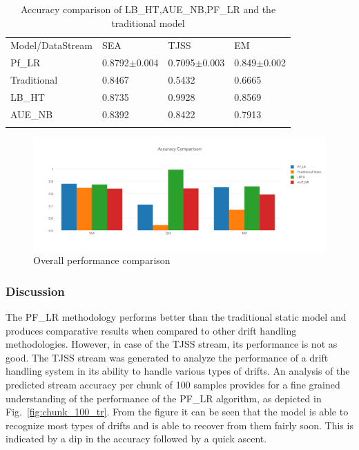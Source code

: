 \documentclass[conference]{IEEEtran}
\begin{document}
\begin{table}
\centering
\caption{Accuracy comparison of LB\_HT,AUE\_NB,PF\_LR and the traditional model}
\begin{tabular}{l l l l} %
\hline\noalign{\smallskip}
Model/DataStream & SEA & TJSS & EM\\
\noalign{\smallskip}\hline\noalign{\smallskip}
Pf\_LR &0.8792$\pm$0.004 &0.7095$\pm$0.003 & 0.849$\pm$0.002\\
Traditional &0.8467 &0.5432&0.6665  \\
LB\_HT &0.8735& 0.9928 &0.8569  \\
AUE\_NB &0.8392 &0.8422 &0.7913  \\ 
\noalign{\smallskip}\hline
\end{tabular} 
\label{table:comparison}
\end{table}

\begin{figure}
\captionsetup{justification=centering}
\centering
\includegraphics[scale=0.3]{fig/accuracy_comparison.png}
\caption{Overall performance comparison}
\label{fig:overallaccuracy} 
\end{figure}

\subsubsection{Discussion}
The PF\_LR methodology performs better than the traditional static model and produces comparative results when compared to other drift handling methodologies. However, in case of the TJSS stream, its performance is not as good. The TJSS stream was generated to analyze the performance of a drift handling system in its ability to handle various types of drifts. An analysis of the predicted stream accuracy per chunk of 100 samples provides for a fine grained understanding of the performance of the PF\_LR algorithm, as depicted in Fig.~\ref{fig:chunk_100_tr}. From the figure it can be seen that the model is able to recognize most types of drifts and is able to recover from them fairly soon. This is indicated by a dip in the accuracy followed by a quick ascent. 
\end{document}
